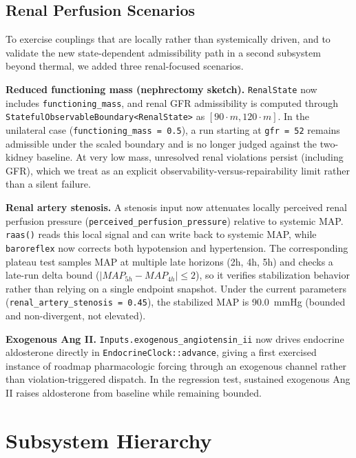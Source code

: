 \documentclass[11pt]{article}
\begin{document}
\subsection{Renal Perfusion Scenarios}
\label{sec:renal-results}

To exercise couplings that are locally rather than systemically driven, and to validate the new state-dependent admissibility path in a second subsystem beyond thermal, we added three renal-focused scenarios.

\textbf{Reduced functioning mass (nephrectomy sketch).} \texttt{RenalState} now includes \texttt{functioning\_mass}, and renal GFR admissibility is computed through \texttt{StatefulObservableBoundary<RenalState>} as $[90\cdot m,120\cdot m]$. In the unilateral case (\texttt{functioning\_mass = 0.5}), a run starting at \texttt{gfr = 52} remains admissible under the scaled boundary and is no longer judged against the two-kidney baseline. At very low mass, unresolved renal violations persist (including GFR), which we treat as an explicit observability-versus-repairability limit rather than a silent failure.

\textbf{Renal artery stenosis.} A stenosis input now attenuates locally perceived renal perfusion pressure (\texttt{perceived\_perfusion\_pressure}) relative to systemic MAP. \texttt{raas()} reads this local signal and can write back to systemic MAP, while \texttt{baroreflex} now corrects both hypotension and hypertension. The corresponding plateau test samples MAP at multiple late horizons (2h, 4h, 5h) and checks a late-run delta bound ($|MAP_{5h}-MAP_{4h}| \le 2$), so it verifies stabilization behavior rather than relying on a single endpoint snapshot. Under the current parameters (\texttt{renal\_artery\_stenosis = 0.45}), the stabilized MAP is 90.0~mmHg (bounded and non-divergent, not elevated).

\textbf{Exogenous Ang II.} \texttt{Inputs.exogenous\_angiotensin\_ii} now drives endocrine aldosterone directly in \texttt{EndocrineClock::advance}, giving a first exercised instance of roadmap pharmacologic forcing through an exogenous channel rather than violation-triggered dispatch. In the regression test, sustained exogenous Ang II raises aldosterone from baseline while remaining bounded.

\section{Subsystem Hierarchy}
\label{sec:roadmap}
\end{document}
